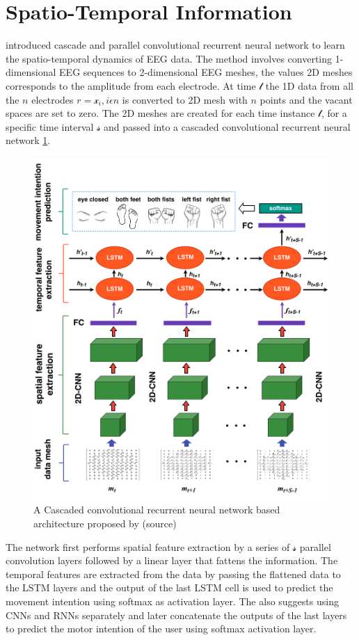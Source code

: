 \section{Spatio-Temporal Information}

\cite{2021_DL_LSTM_MI} introduced cascade and parallel convolutional recurrent neural network to learn the spatio-temporal dynamics of EEG data. The method involves converting 1-dimensional EEG sequences to 2-dimensional EEG meshes, the values 2D meshes corresponds to the amplitude from each electrode. At time $\mathcal{t}$ the 1D data from all the $n$ electrodes $r = \mathcal{x}_i, i \epsilon n$ is converted to 2D mesh with $n$ points and the vacant spaces are set to zero. The 2D meshes are created for each time instance $\mathcal{t}$, for a specific time interval $\mathcal{s}$ and passed into a cascaded convolutional recurrent neural network \ref{fig:2021_DL_LSTM_MI_CCRNN}. 
    \begin{figure}[h] 
        \includegraphics[height=0.6\textwidth]{images/2021_DL_LSTM_MI_CCRNN.png}
        \caption{A Cascaded convolutional recurrent neural network based architecture proposed by \cite{2021_DL_LSTM_MI}(source)}
        \label{fig:2021_DL_LSTM_MI_CCRNN}
    \end{figure}

The network first performs spatial feature extraction by a series of $\mathcal{s}$ parallel convolution layers followed by a linear layer that fattens the information. The temporal features are extracted from the data by passing the flattened data to the LSTM layers and the output of the last LSTM cell is used to predict the movement intention using softmax as activation layer. The \cite{2021_DL_LSTM_MI} also suggests using CNNs and RNNs separately and later concatenate the outputs of the last layers to predict the motor intention of the user using softmax activation layer.

